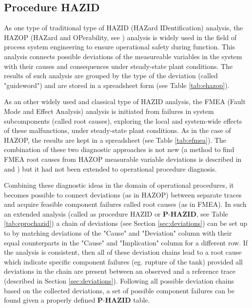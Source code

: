 \documentclass[conference]{IEEEtran}
\begin{document}
\subsection{Procedure HAZID}
\label{sec:prochazid}

As one type of traditional type of HAZID (HAZard IDentification) analysis, the HAZOP (HAZard and OPerability, see \cite{hazop_book}) analysis is widely used in the field of process system engineering to ensure operational safety during function. This analysis connects possible deviations of the measureable variables in the system with their causes and consequences under steady-state plant conditions. The results of such analysis are grouped by the type of the deviation (called "guideword") and are stored in a spreadsheet form (see Table \ref{tab:ehazop}). 

As an other widely used and classical type of HAZID analysis, the FMEA (Fault Mode and Effect Analysis) analysis is initiated from failures in system subcomponents (called root causes), exploring the local and system-wide effects of these malfunctions, under steady-state plant conditions. As in the case of HAZOP, the results are kept in a spreadsheet (see Table \ref{tab:efmea}). The combination of these two diagnostic approaches is not new (a method to find FMEA root causes from HAZOP measurable variable deviations is described in \cite{com_hazop_fmea} and \cite{com_hazop_fmea2}) but it had not been extended to operational procedure diagnosis.

Combining these diagnostic ideas in the domain of operational procedures, it becomes possible to connect deviations (as in HAZOP) between separate traces and acquire feasible component failures called root causes (as in FMEA). In such an extended analysis (called as procedure HAZID or  $\textbf{P-HAZID}$, see Table \ref{tab:eprochazid}) a chain of deviations (see Section \ref{sec:deviations}) can be set up to by matching deviations of the "Cause" and "Deviation" column with their equal counterparts in the "Cause" and "Implication" column for a different row. If the analysis is consistent, then all of these deviation chains lead to a root cause which indicate specific component failures (eg. rupture of the tank) provided all deviations in the chain are present between an observed and a reference trace (described in Section \ref{sec:deviations}). Following all possible deviation chains based on the collected deviations, a set of possible component failures can be found given a properly defined $\textbf{P-HAZID}$ table. 
\end{document}
